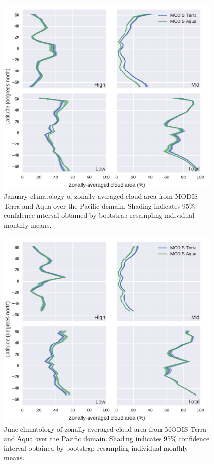\begin{figure}[tp]
\centering
\includegraphics{graphics/misr_cldmodis_zonal_2008-01.pdf}
\caption{\label{fig:misr_cldmodis_zonal_january}January climatology of
zonally-averaged cloud area from MODIS Terra and Aqua over the Pacific
domain. Shading indicates 95\% confidence interval obtained by bootstrap
resampling individual
monthly-means.}\label{fig:misrux5fcldmodisux5fzonalux5fjanuary}
\end{figure}

\begin{figure}[tp]
\centering
\includegraphics{graphics/misr_cldmodis_zonal_2008-06.pdf}
\caption{\label{fig:misr_cldmodis_zonal_june}June climatology of
zonally-averaged cloud area from MODIS Terra and Aqua over the Pacific
domain. Shading indicates 95\% confidence interval obtained by bootstrap
resampling individual
monthly-means.}\label{fig:misrux5fcldmodisux5fzonalux5fjune}
\end{figure}

